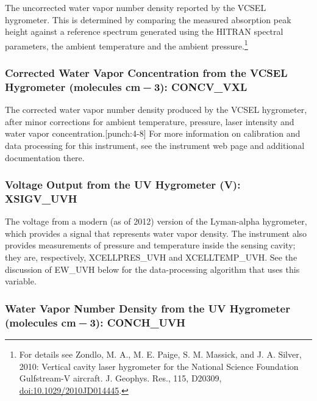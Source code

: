 \documentclass[
  english,
]{book}
\begin{document}
The uncorrected water vapor number density reported by the VCSEL hygrometer. This is determined by comparing the measured absorption peak height against a reference spectrum generated using the HITRAN spectral parameters, the ambient temperature and the ambient pressure.\footnote{For details see Zondlo, M. A., M. E. Paige, S. M. Massick, and J. A. Silver, 2010: Vertical cavity laser hygrometer for the National Science Foundation Gulfstream-V aircraft. J. Geophys. Res., 115, D20309, \url{doi:10.1029/2010JD014445}.}

\hypertarget{vcsel-corr}{%
\subsubsection*{\texorpdfstring{Corrected Water Vapor Concentration from the VCSEL Hygrometer (molecules cm{ − 3}): CONCV\_VXL}{Corrected Water Vapor Concentration from the VCSEL Hygrometer (molecules cm − 3): CONCV\_VXL}}\label{vcsel-corr}}

The corrected water vapor number density produced by the VCSEL hygrometer, after minor corrections for ambient temperature, pressure, laser intensity and water vapor concentration.\protect\hypertarget{punch:4-8}{}{{[}punch:4-8{]}} For more information on calibration and data processing for this instrument, see the instrument web page and additional documentation there.

\hypertarget{uvh-voltage}{%
\subsubsection*{Voltage Output from the UV Hygrometer (V): XSIGV\_UVH}\label{uvh-voltage}}

The voltage from a modern (as of 2012) version of the Lyman-alpha hygrometer, which provides a signal that represents water vapor density. The instrument also provides measurements of pressure and temperature inside the sensing cavity; they are, respectively, XCELLPRES\_UVH and XCELLTEMP\_UVH. See the discussion of EW\_UVH below for the data-processing algorithm that uses this variable.

\hypertarget{uvh-n}{%
\subsubsection*{\texorpdfstring{Water Vapor Number Density from the UV Hygrometer (molecules cm{ − 3}): CONCH\_UVH}{Water Vapor Number Density from the UV Hygrometer (molecules cm − 3): CONCH\_UVH}}\label{uvh-n}}
\end{document}
